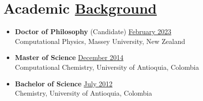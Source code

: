 \section{Academic \href{.}{Background}}

\begin{itemize}
    \itemsep-1mm
    \item {\bf Doctor of Philosophy} (Candidate)\hfill
          \href{.}{February 2023}\\
          Computational Physics, Massey University, New Zealand
    \item {\bf Master of Science}\hfill
          \href{.}{December 2014}\\
          Computational Chemistry, University of Antioquia, Colombia
    \item {\bf Bachelor of Science}\hfill
          \href{.}{July 2012}\\
          Chemistry, University of Antioquia, Colombia
\end{itemize}